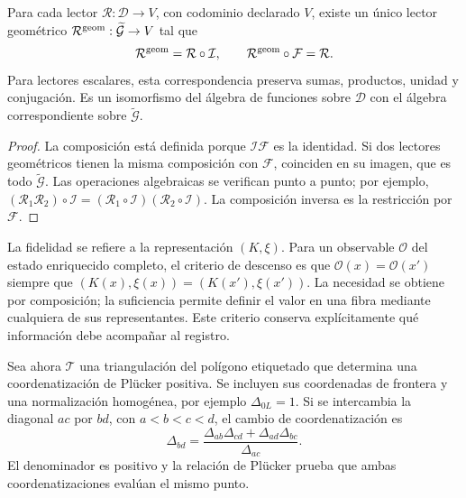 \begin{theorem}
\label{thm:compat-algebra-lectores}
Para cada lector \(\mathcal R:\mathcal D\to V\), con codominio
declarado \(V\), existe un único lector geométrico
\(\mathcal R^{\rm geom}:\widetilde{\mathcal G}\to V\) tal que
\[
 \mathcal R^{\rm geom}=\mathcal R\circ\mathcal I,
 \qquad \mathcal R^{\rm geom}\circ\mathcal F=\mathcal R.
\]
Para lectores escalares, esta correspondencia preserva sumas, productos,
unidad y conjugación. Es un isomorfismo del álgebra de funciones sobre
\(\mathcal D\) con el álgebra correspondiente sobre
\(\widetilde{\mathcal G}\).
\end{theorem}
\begin{proof}
La composición está definida porque \(\mathcal I\mathcal F\) es
la identidad. Si dos lectores geométricos tienen la misma composición
con \(\mathcal F\), coinciden en su imagen, que es todo
\(\widetilde{\mathcal G}\). Las operaciones algebraicas se verifican
punto a punto; por ejemplo,
\((\mathcal R_1\mathcal R_2)\circ\mathcal I=
(\mathcal R_1\circ\mathcal I)(\mathcal R_2\circ\mathcal I)\).
La composición inversa es la restricción por \(\mathcal F\).
\end{proof}

La fidelidad se refiere a la representación \((K,\xi)\). Para un
observable \(\mathcal O\) del estado enriquecido completo, el criterio
de descenso es que \(\mathcal O(x)=\mathcal O(x')\) siempre que
\((K(x),\xi(x))=(K(x'),\xi(x'))\). La necesidad se obtiene por
composición; la suficiencia permite definir el valor en una fibra
mediante cualquiera de sus representantes. Este criterio conserva
explícitamente qué información debe acompañar al registro.

Sea ahora \(\mathcal T\) una triangulación del polígono etiquetado
que determina una coordenatización de Plücker positiva. Se incluyen sus coordenadas
de frontera y una normalización homogénea, por ejemplo
\(\Delta_{0L}=1\). Si se intercambia la diagonal \(ac\) por
\(bd\), con \(a<b<c<d\), el cambio de coordenatización es
\begin{equation}
 \Delta_{bd}=
 \frac{\Delta_{ab}\Delta_{cd}+\Delta_{ad}\Delta_{bc}}{\Delta_{ac}}.
 \label{eq:compat-cambio-carta}
\end{equation}
El denominador es positivo y la relación de Plücker prueba que ambas
coordenatizaciones evalúan el mismo punto.

